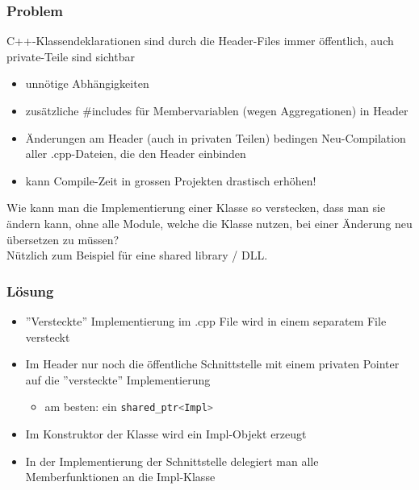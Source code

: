 \subsubsection{Problem}
C++-Klassendeklarationen sind durch die Header-Files immer öffentlich, auch private-Teile sind sichtbar
\begin{itemize}
  \item unnötige Abhängigkeiten
  \item zusätzliche \#includes für Membervariablen (wegen Aggregationen) in Header
  \item Änderungen am Header (auch in privaten Teilen) bedingen Neu-Compilation aller .cpp-Dateien, die den Header einbinden
  \item kann Compile-Zeit in grossen Projekten drastisch erhöhen!
\end{itemize}
Wie kann man die Implementierung einer Klasse so verstecken, dass man sie ändern kann, ohne alle Module, welche die Klasse nutzen, bei einer Änderung neu übersetzen zu müssen?\\
Nützlich zum Beispiel für eine shared library / DLL.

\subsubsection{Lösung}
\begin{itemize}
\item ''Versteckte'' Implementierung im .cpp File wird in einem separatem File versteckt
\item Im Header nur noch die öffentliche Schnittstelle mit einem privaten Pointer auf die ''versteckte'' Implementierung
\begin{itemize}
  \item am besten: ein \lstinline[language=C++]{shared_ptr<Impl>}
\end{itemize}
\item Im Konstruktor der Klasse wird ein Impl-Objekt erzeugt
\item In der Implementierung der Schnittstelle delegiert man alle Memberfunktionen an die Impl-Klasse
\end{itemize}

